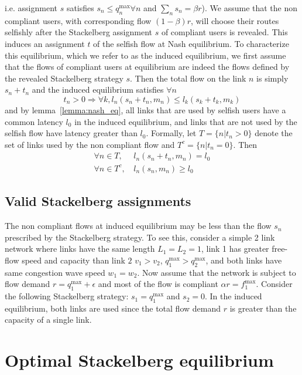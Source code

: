 i.e. assignment $s$ satisfies $s_n \leq q_n^{\max} \forall n$ and $\sum_n s_n = \beta r$). 
We assume that the non compliant users, with corresponding flow $(1-\beta)r$, will choose their routes selfishly after the Stackelberg assignment $s$ of compliant users is revealed. This induces an assignment $t$ of the selfish flow at Nash equilibrium. To characterize this equilibrium, which we refer to as the induced equilibrium, we first assume that the flows of compliant users at equilibrium are indeed the flows defined by the revealed Stackelberg strategy $s$. Then the total flow on the link $n$ is simply $s_n + t_n$ and the induced equilibrium satisfies $\forall n$
\[
t_n > 0 \Rightarrow \forall k, l_n(s_n + t_n, m_n) \leq l_k(s_k + t_k, m_k)
\]
and by lemma~\ref{lemma:nash_eq}, all links that are used by selfish users have a common latency $l_0$ in the induced equilibrium, and links that are not used by the selfish flow have latency greater than $l_0$. Formally, let $T = \{n | t_n >0\}$ denote the set of links used by the non compliant flow and $T^c = \{n | t_n = 0\}$. Then
\begin{align*}
\forall n \in T,\, &l_n(s_n + t_n, m_n) = l_0 \\
\forall n \in T^c,\, &l_n(s_n, m_n) \geq l_0
\end{align*}

\subsection{Valid Stackelberg assignments}

The non compliant flows at induced equilibrium may be less than the flow $s_n$ prescribed by the Stackelberg strategy. To see this, consider a simple 2 link network where links have the same length $L_1 = L_2 = 1$, link 1 has greater free-flow speed and capacity than link $2$ $v_1 > v_2$, $q_1^{\max} > q_2^{\max}$, and both links have same congestion wave speed $w_1 = w_2$.
Now assume that the network is subject to flow demand $r = q_1^{\max} + \epsilon$ and most of the flow is compliant $\alpha r = f_1^{\max}$. Consider the following Stackelberg strategy: $s_1 = q_1^{\max}$ and $s_2 = 0$.
In the induced equilibrium, both links are used since the total flow demand $r$ is greater than the capacity of a single link. 





\section{Optimal Stackelberg equilibrium}

